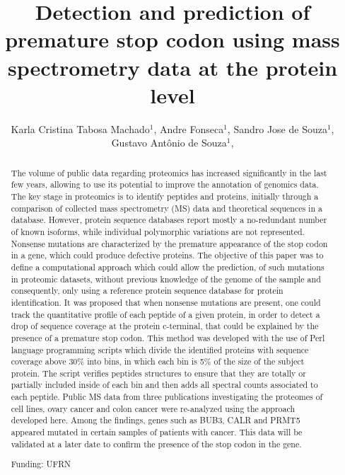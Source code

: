 \documentclass[twoside]{article}
\title{\vspace{-15mm}\fontsize{24pt}{10pt}\selectfont\textbf{ Detection and prediction of premature stop codon using mass spectrometry data at the protein level }} %
\author{ Karla Cristina Tabosa Machado$^{1}$, Andre Fonseca$^{1}$, Sandro Jose de Souza$^{1}$, Gustavo Antônio de Souza$^{1}$, }
\affil{ 1 Universidade Federal do Rio Grande do Norte

 }
\date{}
\begin{document}
  
  
  \maketitle %
  
  
  \thispagestyle{fancy} %
  
  
  \begin{abstract}
  The volume of public data regarding proteomics has increased significantly in the last few years, allowing to use its potential to improve the annotation of genomics data. The key stage in proteomics is to identify peptides and proteins, initially through a  comparison of collected mass spectrometry (MS) data and theoretical sequences in a database. However, protein sequence databases report mostly a no-redundant number of known isoforms, while individual polymorphic variations are not represented. Nonsense mutations are characterized by the premature appearance of the stop codon in a gene, which could produce defective proteins. The objective of this paper was to define a computational approach which could allow the prediction, of such mutations in proteomic datasets, without previous knowledge of the genome of the sample and consequently, only using a reference protein sequence database for protein identification. It was proposed that when nonsense mutations are present, one could track the quantitative profile of each peptide of a given protein,  in order to detect a drop of sequence coverage at the protein c-terminal, that could be explained by the presence of a premature stop codon. This method was developed with the use of Perl language programming scripts which divide the identified proteins with sequence coverage above 30\% into bins, in which each bin is 5\% of the size of the subject protein. The script verifies peptides structures to ensure that they are totally or partially included inside of each bin and then adds all spectral counts associated to each peptide. Public MS data from three publications investigating the proteomes of cell lines, ovary cancer and colon cancer were re-analyzed using the approach developed here. Among the findings, genes such as BUB3, CALR and PRMT5 appeared mutated in certain samples of patients with cancer. This data will be validated at a later date to confirm the presence of the stop codon in the gene.
  
  Funding: UFRN \\ 
  \end{abstract}
  
\end{document}
